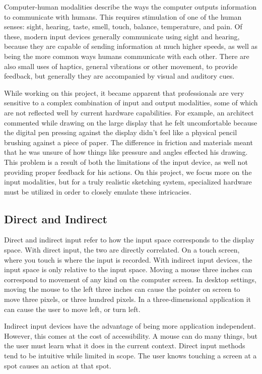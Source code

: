 Computer-human modalities describe the ways the computer outputs information to communicate with humans.
This requires stimulation of one of the human senses: sight, hearing, taste, smell, touch, balance, temperature, and pain. 
Of these, modern input devices generally communicate using sight and hearing, because they are capable of sending information at much higher speeds, as well as being the more common ways humans communicate with each other.
There are also small uses of haptics, general vibrations or other movement, to provide feedback, but generally they are accompanied by visual and auditory cues.

While working on this project, it became apparent that professionals are very sensitive to a complex combination of input and output modalities, some of which are not reflected well by current hardware capabilities. 
For example, an architect commented while drawing on the large display that he felt uncomfortable because the digital pen pressing against the display didn't feel like a physical pencil brushing against a piece of paper. 
The difference in friction and materials meant that he was unsure of how things like pressure and angles effected his drawing.
This problem is a result of both the limitations of the input device, as well not providing proper feedback for his actions.
On this project, we focus more on the input modalities, but for a truly realistic sketching system, specialized hardware must be utilized in order to closely emulate these intricacies.

\subsection{Direct and Indirect}
Direct and indirect input refer to how the input space corresponds to the display space. 
With direct input, the two are directly correlated. 
On a touch screen, where you touch is where the input is recorded. 
With indirect input devices, the input space is only relative to the input space. Moving a mouse three inches can correspond to movement of any kind on the computer screen. 
In desktop settings, moving the mouse to the left three inches can cause the pointer on screen to move three pixels, or three hundred pixels. 
In a three-dimensional application it can cause the user to move left, or turn left.

Indirect input devices have the advantage of being more application independent. However, this comes at the cost of accessibility. 
A mouse can do many things, but the user must learn what it does in the current context. 
Direct input methods tend to be intuitive while limited in scope. 
The user knows touching a screen at a spot causes an action at that spot.

